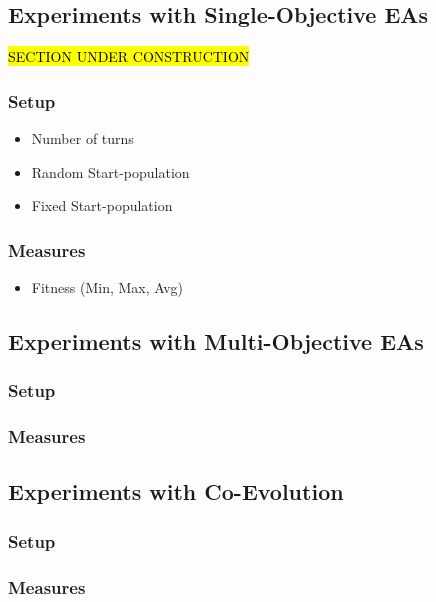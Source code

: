 \subsection{Experiments with Single-Objective EAs}
\hl{SECTION UNDER CONSTRUCTION}\\
\subsubsection{Setup}
\begin{itemize}
    \item Number of turns
    \item Random Start-population
    \item Fixed Start-population
\end{itemize}
\subsubsection{Measures}
\begin{itemize}
    \item Fitness (Min, Max, Avg)
\end{itemize}

\subsection{Experiments with Multi-Objective EAs}
\subsubsection{Setup}
\subsubsection{Measures}

\subsection{Experiments with Co-Evolution}
\subsubsection{Setup}
\subsubsection{Measures}

\iffalse
\subsection{Experiments with Human Interaction}
\subsubsection{Setup}
\begin{itemize}
    \item Number of turns
    \item Random Start-population
    \item Fixed Start-population
\end{itemize}
\subsubsection{Measures}
\begin{itemize}
    \item Fitness (Min, Max, Avg)
    \item Time complexity
    \item Space complexity
\end{itemize}
\fi
